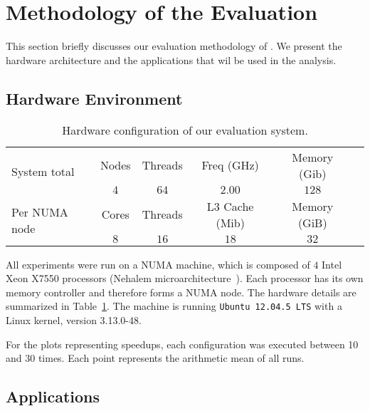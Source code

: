 
\section{Methodology of the Evaluation}
\label{sec:expe}

This section briefly discusses our evaluation methodology of \TABARNAC.
We present the hardware architecture and the applications that wil be used in the analysis.

\subsection{Hardware Environment}
\label{sec:expe-setup}

\begin{table}[!b]
    \centering
    \caption{Hardware configuration of our evaluation system.}
    \label{tab:turing}
    \footnotesize
        \begin{tabular}{lccccc}
            \toprule
            \multirow{2}{1.5cm}{System total} & Nodes & Threads & Freq (GHz) & Memory (Gib) \\
            \cmidrule(lr){2-5}
                & $4$   & $64$ & $2.00$ & $128$ \\
            \midrule
           \multirow{2}{1.5cm}{\vspace{2mm}Per NUMA node} & Cores & Threads & L3 Cache (Mib) & Memory (GiB) \\
           \cmidrule(lr){2-5}
            & $8$ & $16$ & $18$ & $32$  \\
            \bottomrule
        \end{tabular}

\end{table}

All experiments were run on a NUMA machine, which is composed of $4$ Intel Xeon X7550
processors (Nehalem microarchitecture~\cite{Intel2010}). Each processor has its own memory controller and therefore forms a NUMA node. The hardware details are summarized in Table~\ref{tab:turing}.
The machine is running \texttt{Ubuntu 12.04.5 LTS} with a Linux kernel, version 3.13.0-48.

For the plots representing speedups, each configuration was executed between 10 and 30
times. Each point represents the arithmetic mean of all runs.

\subsection{Applications}

